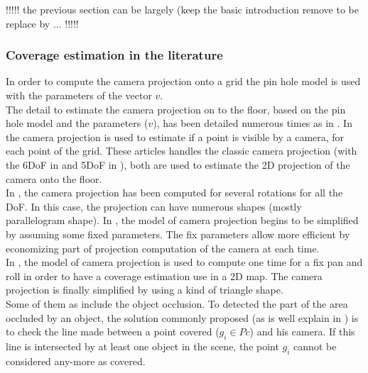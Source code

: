 !!!!! the previous section can be largely (keep the basic introduction remove to be replace by ... !!!!!
\fi
\subsubsection{Coverage estimation in the literature}

 In order to compute the camera projection onto a grid the pin hole model is used with the parameters of the vector $v$.\\
The detail to estimate the camera projection on to the floor, based on the pin hole model and the parameters ($v$), has been detailed numerous times as in \cite{193*fu2014,181*wang2017,165*jiang2010}. In \cite{193*fu2014,181*wang2017,165*jiang2010} the camera projection is used to estimate if a point is visible by a camera, for each point of the grid. These articles handles the classic camera projection (with the 6DoF in \citep{193*fu2014} and 5DoF in \citep{181*wang2017}), both are used to estimate the 2D projection of the camera onto the floor. \\
In  \citep{193*fu2014}, the camera projection has been computed for several rotations for all the DoF. In this case, the projection can have numerous shapes (mostly parallelogram shape).
In \citep{181*wang2017}, the model of camera projection begins to be simplified by assuming some fixed parameters. The fix parameters allow more efficient by economizing part of projection computation of the camera at each time.  \\
In \citep{165*jiang2010}, the model of camera projection is used to compute one time for a fix pan and roll in order to have a coverage estimation use in a 2D map. The camera projection is finally simplified by using a kind of triangle shape.\\
 Some of them as \citep{165*jiang2010,181*wang2017,141*akbarzadeh2013} include the object occlusion. To detected the part of the area occluded by an object, the solution commonly proposed (as is well explain in  \citep{181*wang2017}) is to check the line made between a point covered ($g_i \in Pc$) and his camera. If this line is intersected by at least one object in the scene, the point $g_i$ cannot be considered any-more as covered. 

